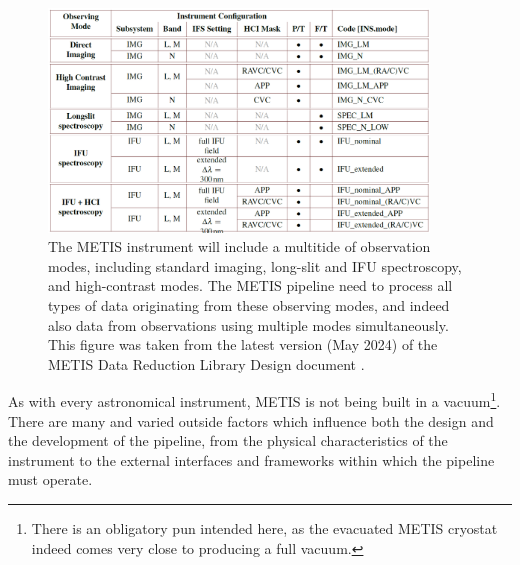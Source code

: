 \documentclass[a4paper]{spie}  %
\begin{document}

\begin{figure}
    \centering
    \includegraphics[width=0.9\textwidth]{SPIE_paper/figures/METIS_modes.png}
    \caption{The METIS instrument will include a multitide of observation modes, including standard imaging, long-slit and IFU spectroscopy, and high-contrast modes. The METIS pipeline need to process all types of data originating from these observing modes, and indeed also data from observations using multiple modes simultaneously. This figure was taken from the latest version (May 2024) of the METIS Data Reduction Library Design document \cite{DRLD}.}
    \label{fig:metis_modes}
\end{figure}


As with every astronomical instrument, METIS is not being built in a vacuum\footnote{There is an obligatory pun intended here, as the evacuated METIS cryostat indeed comes very close to producing a full vacuum.}. 
There are many and varied outside factors which influence both the design and the development of the pipeline, from the physical characteristics of the instrument to the external interfaces and frameworks within which the pipeline must operate.
\end{document}
